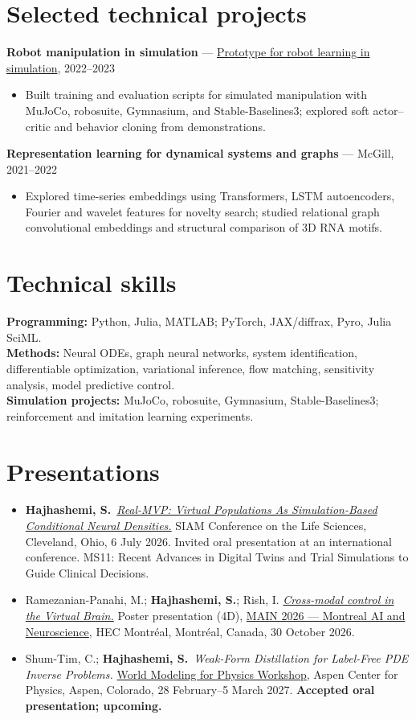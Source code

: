 \documentclass[11pt,letterpaper]{article}
\newcommand{\me}{\textbf{Hajhashemi, S.}}
\begin{document}
\section*{Selected technical projects}
\textbf{Robot manipulation in simulation} — \href{https://github.com/shayshay42/robot}{Prototype for robot learning in simulation}, 2022--2023
\begin{itemize}
\item Built training and evaluation scripts for simulated manipulation with MuJoCo, robosuite, Gymnasium, and Stable-Baselines3; explored soft actor--critic and behavior cloning from demonstrations.
\end{itemize}
\textbf{Representation learning for dynamical systems and graphs} — McGill, 2021--2022
\begin{itemize}
\item Explored time-series embeddings using Transformers, LSTM autoencoders, Fourier and wavelet features for novelty search; studied relational graph convolutional embeddings and structural comparison of 3D RNA motifs.
\end{itemize}

\section*{Technical skills}
\textbf{Programming:} Python, Julia, MATLAB; PyTorch, JAX/diffrax, Pyro, Julia SciML.\\
\textbf{Methods:} Neural ODEs, graph neural networks, system identification, differentiable optimization, variational inference, flow matching, sensitivity analysis, model predictive control.\\
\textbf{Simulation projects:} MuJoCo, robosuite, Gymnasium, Stable-Baselines3; reinforcement and imitation learning experiments.

\section*{Presentations}
\begin{itemize}[leftmargin=1.15em,itemsep=6pt]
\item \me\ \href{https://meetings.siam.org/sess/dsp_talk.cfm?p=157552}{\textit{Real-MVP: Virtual Populations As Simulation-Based Conditional Neural Densities.}}
SIAM Conference on the Life Sciences, Cleveland, Ohio, 6 July 2026.
Invited oral presentation at an international conference. MS11: Recent Advances in Digital Twins and Trial Simulations to Guide Clinical Decisions.
\item Ramezanian-Panahi, M.; \me; Rish, I.
\href{https://www.main2026.org/abstracts}{\textit{Cross-modal control in the Virtual Brain.}}
Poster presentation (4D), \href{https://www.main2026.org/program}{MAIN 2026 — Montreal AI and Neuroscience}, HEC Montréal, Montréal, Canada, 30 October 2026.
\item Shum-Tim, C.; \me\ \textit{Weak-Form Distillation for Label-Free PDE Inverse Problems.}
\href{https://wmw-aspen.github.io/}{World Modeling for Physics Workshop}, Aspen Center for Physics, Aspen, Colorado, 28 February--5 March 2027.
\textbf{Accepted oral presentation; upcoming.}
\end{itemize}
\end{document}
